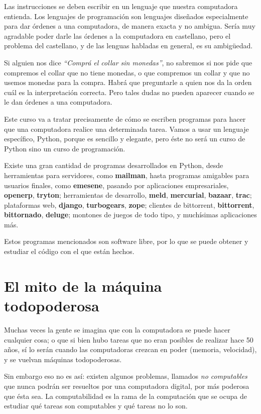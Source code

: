 Las instrucciones se deben escribir en un lenguaje que nuestra
computadora entienda. Los lenguajes de programación son
lenguajes diseñados especialmente para dar
órdenes a una computadora, de manera exacta y no ambigua. Sería
muy agradable poder darle las órdenes a la computadora en
castellano, pero el problema del castellano, y de las lenguas
habladas en general, es su ambigüedad.

Si alguien nos dice \emph{``Comprá el collar sin monedas''}, no sabremos
si nos pide que compremos el collar que no tiene monedas, o que compremos
un collar y que no usemos monedas para la compra. Habrá que preguntarle
a quien nos da la orden cuál es la interpretación correcta. Pero tales
dudas no pueden aparecer cuando se le dan órdenes a una computadora.

Este curso va a tratar precisamente de cómo se escriben programas
para hacer que una computadora realice una determinada tarea.
Vamos a usar un lenguaje específico, Python, porque es sencillo y
elegante, pero éste no será un curso de Python sino un curso de
programación.

\begin{sabias_que}
Existe una gran cantidad de programas desarrollados en Python, desde
herramientas para servidores, como {\bf mailman}, hasta programas amigables
para usuarios finales, como {\bf emesene}, pasando por aplicaciones
empresariales, {\bf openerp}, {\bf tryton}; herramientas de desarrollo,
{\bf meld}, {\bf mercurial}, {\bf bazaar}, {\bf trac}; plataformas web,
{\bf django}, {\bf turbogears}, {\bf zope}; clientes de bittorrent, {\bf
bittorrent}, {\bf bittornado}, {\bf deluge}; montones de juegos de todo
tipo, y muchísimas aplicaciones más.

Estos programas mencionados son software libre, por lo que se puede obtener y
estudiar el código con el que están hechos.
\end{sabias_que}

\section{El mito de la máquina todopoderosa}

Muchas veces la gente se imagina que con la computadora se puede
hacer cualquier cosa; o que si bien hubo tareas que no eran posibles de
realizar hace 50 años, sí lo serán cuando las computadoras crezcan en poder 
(memoria, velocidad), y se vuelvan máquinas todopoderosas.

Sin embargo eso no es así: existen algunos problemas, llamados
\emph{no computables} que nunca podrán ser resueltos por una
computadora digital, por más poderosa que ésta sea. La
computabilidad es la rama de la computación que se ocupa de
estudiar qué tareas son computables y qué tareas no lo son.

